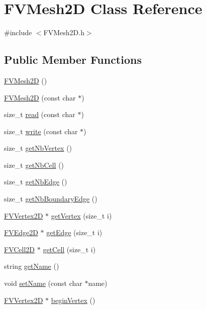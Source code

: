 \hypertarget{classFVMesh2D}{
\section{FVMesh2D Class Reference}
\label{d3/d18/classFVMesh2D}
}


{\ttfamily \#include $<$FVMesh2D.h$>$}

\subsection*{Public Member Functions}
\begin{DoxyCompactItemize}
\item 
\hyperlink{classFVMesh2D_acdfe4ab12400f4046622b54f80456bd3}{FVMesh2D} ()
\item 
\hyperlink{classFVMesh2D_a87ba6f103bdc761e875f15ba75f9c575}{FVMesh2D} (const char $\ast$)
\item 
size\_\-t \hyperlink{classFVMesh2D_a25c8ba5048b8d53613b14c9e0f0e4a34}{read} (const char $\ast$)
\item 
size\_\-t \hyperlink{classFVMesh2D_a4afe5a96e4659fea7ca076ddf1da3620}{write} (const char $\ast$)
\item 
size\_\-t \hyperlink{classFVMesh2D_a8197b8765302aecf9e815d0a29e14a8d}{getNbVertex} ()
\item 
size\_\-t \hyperlink{classFVMesh2D_a64ae6d6814ef01f53f6fd2f2f9ff8a0c}{getNbCell} ()
\item 
size\_\-t \hyperlink{classFVMesh2D_a08dfee0bb433dbc6b3eaa1e0bd371b67}{getNbEdge} ()
\item 
size\_\-t \hyperlink{classFVMesh2D_a932efb377f22ff9b428866a9b1b38b25}{getNbBoundaryEdge} ()
\item 
\hyperlink{classFVVertex2D}{FVVertex2D} $\ast$ \hyperlink{classFVMesh2D_a345c693f9cb246737bdc9048ab293bf7}{getVertex} (size\_\-t i)
\item 
\hyperlink{classFVEdge2D}{FVEdge2D} $\ast$ \hyperlink{classFVMesh2D_a94ad141c643a25ddaedf8a741ae0a116}{getEdge} (size\_\-t i)
\item 
\hyperlink{classFVCell2D}{FVCell2D} $\ast$ \hyperlink{classFVMesh2D_a96fa97f21e6b64fc641b4aaf10d51cf0}{getCell} (size\_\-t i)
\item 
string \hyperlink{classFVMesh2D_a11335e13e50af74108bf926dc1340b4b}{getName} ()
\item 
void \hyperlink{classFVMesh2D_ab3a256e7d9fad73fa57de7c1fedf51c5}{setName} (const char $\ast$name)
\item 
\hyperlink{classFVVertex2D}{FVVertex2D} $\ast$ \hyperlink{classFVMesh2D_a67415ad3823d1cd8030deaa6c4123f45}{beginVertex} ()

\end{DoxyCompactItemize}
